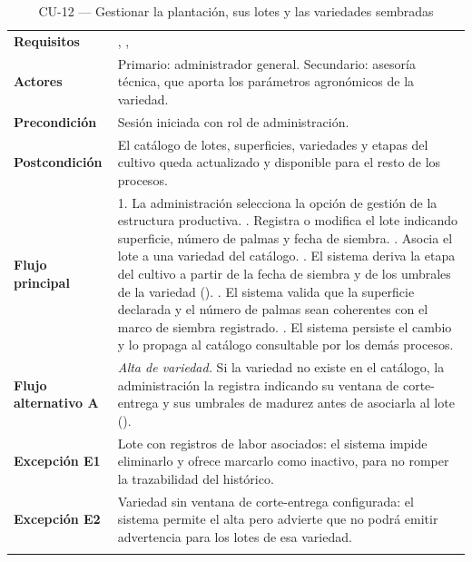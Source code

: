 \begin{longtable}{|L{3.4cm}|L{12.0cm}|}
\hline
{}\\
\hline
\textbf{Requisitos} & , ,  \\ \hline
\textbf{Actores} & Primario: administrador general. Secundario: asesoría técnica, que aporta los parámetros agronómicos de la variedad. \\ \hline
\textbf{Precondición} & Sesión iniciada con rol de administración. \\ \hline
\textbf{Postcondición} & El catálogo de lotes, superficies, variedades y etapas del cultivo queda actualizado y disponible para el resto de los procesos. \\ \hline
\textbf{Flujo principal} & 1. La administración selecciona la opción de gestión de la estructura productiva. . Registra o modifica el lote indicando superficie, número de palmas y fecha de siembra. . Asocia el lote a una variedad del catálogo. . El sistema deriva la etapa del cultivo a partir de la fecha de siembra y de los umbrales de la variedad (). . El sistema valida que la superficie declarada y el número de palmas sean coherentes con el marco de siembra registrado. . El sistema persiste el cambio y lo propaga al catálogo consultable por los demás procesos. \\ \hline
\textbf{Flujo alternativo A} & \emph{Alta de variedad.} Si la variedad no existe en el catálogo, la administración la registra indicando su ventana de corte-entrega y sus umbrales de madurez antes de asociarla al lote (). \\ \hline
\textbf{Excepción E1} & Lote con registros de labor asociados: el sistema impide eliminarlo y ofrece marcarlo como inactivo, para no romper la trazabilidad del histórico. \\ \hline
\textbf{Excepción E2} & Variedad sin ventana de corte-entrega configurada: el sistema permite el alta pero advierte que  no podrá emitir advertencia para los lotes de esa variedad. \\ \hline
\caption{CU-12 --- Gestionar la plantación, sus lotes y las variedades sembradas}
\end{longtable}

